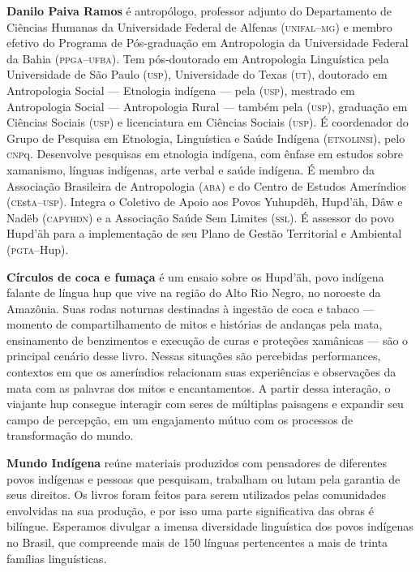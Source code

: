 \textbf{Danilo Paiva Ramos} é antropólogo, professor adjunto do Departamento de Ciências Humanas da Universidade Federal de Alfenas (\textsc{unifal--mg}) e membro efetivo do Programa de Pós-graduação em Antropologia da Universidade Federal da Bahia (\textsc{ppga--ufba}). Tem pós-doutorado em Antropologia Linguística pela Universidade de São Paulo (\textsc{usp}), Universidade do Texas (\textsc{ut}), doutorado em Antropologia Social --- Etnologia indígena --- pela (\textsc{usp}), mestrado em Antropologia Social --- Antropologia Rural --- também pela (\textsc{usp}), graduação em Ciências Sociais (\textsc{usp}) e licenciatura em Ciências Sociais (\textsc{usp}). É coordenador do Grupo de Pesquisa em Etnologia, Linguística e Saúde Indígena (\textsc{etnolinsi}), pelo \textsc{cnp}q. Desenvolve pesquisas em etnologia indígena, com ênfase em estudos sobre xamanismo, línguas indígenas, arte verbal e saúde indígena. É membro da Associação Brasileira de Antropologia (\textsc{aba}) e do Centro de Estudos Ameríndios (\textsc{ce}st\textsc{a}--\textsc{usp}). Integra o Coletivo de Apoio aos Povos Yuhupdëh, Hupd'äh, Dâw e Nadëb (\textsc{capyhdn}) e a Associação Saúde Sem Limites (\textsc{ssl}). É assessor do povo Hupd'äh para a implementação de seu Plano de Gestão Territorial e Ambiental (\textsc{pgta}--Hup).

\textbf{Círculos de coca e fumaça} é um ensaio sobre os Hupd’äh, povo indígena falante de língua hup que vive na região do Alto Rio Negro, no noroeste da Amazônia. Suas rodas noturnas destinadas à ingestão de coca e tabaco --- momento de compartilhamento de mitos e histórias de andanças pela mata, ensinamento de benzimentos e execução de curas e proteções xamânicas --- são o principal cenário desse livro. Nessas situações são percebidas performances, contextos em que os ameríndios relacionam suas experiências e observações da mata com as palavras dos mitos e encantamentos. A partir dessa interação, o viajante hup consegue interagir com seres de múltiplas paisagens e expandir seu campo de percepção, em um engajamento mútuo com os processos de transformação do mundo.

\textbf{Mundo Indígena} reúne materiais produzidos com pensadores de diferentes povos indígenas e pessoas que pesquisam, trabalham ou lutam pela garantia de seus direitos. Os livros foram feitos para serem utilizados pelas comunidades envolvidas na sua produção, e por isso uma parte significativa das obras é bilíngue. Esperamos divulgar a imensa diversidade linguística dos povos indígenas no Brasil, que compreende mais de 150 línguas pertencentes a mais de trinta famílias linguísticas.


